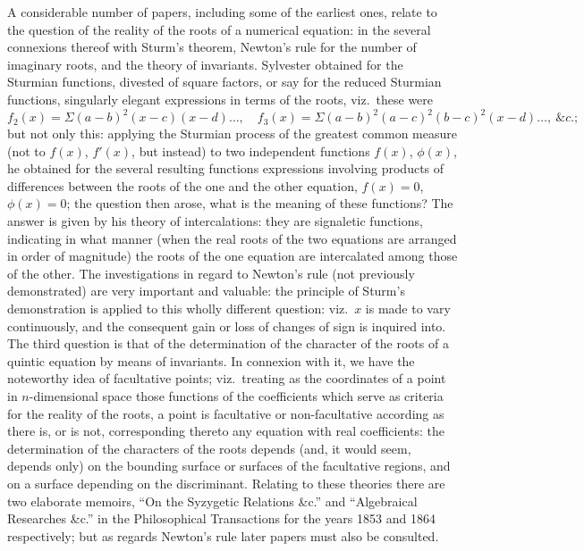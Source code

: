 \documentclass[11pt,a4paper]{book}
\begin{document}
A considerable number of papers, including some of the earliest ones, relate to the question of the reality of the roots of a numerical equation: in the several connexions thereof with Sturm's theorem, Newton's rule for the number of imaginary roots, and the theory of invariants. Sylvester obtained for the Sturmian functions, divested of square factors, or say for the reduced Sturmian functions, singularly elegant expressions in terms of the roots, viz.\ these were
\[
f_2(x) = \Sigma(a-b)^2(x-c)(x-d)\ldots,\quad f_3(x) = \Sigma(a-b)^2(a-c)^2(b-c)^2(x-d)\ldots,\ \&c.;
\]
but not only this: applying the Sturmian process of the greatest common measure (not to $f(x)$, $f'(x)$, but instead) to two independent functions $f(x)$, $\phi(x)$, he obtained for the several resulting functions expressions involving products of differences between the roots of the one and the other equation, $f(x) = 0$, $\phi(x) = 0$; the question then arose, what is the meaning of these functions? The answer is given by his theory of intercalations: they are signaletic functions, indicating in what manner (when the real roots of the two equations are arranged in order of magnitude) the roots of the one equation are intercalated among those of the other. The investigations in regard to Newton's rule (not previously demonstrated) are very important and valuable: the principle of Sturm's demonstration is applied to this wholly different question: viz.\ $x$ is made to vary continuously, and the consequent gain or loss of changes of sign is inquired into. The third question is that of the determination of the character of the roots of a quintic equation by means of invariants. In connexion with it, we have the noteworthy idea of facultative points; viz.\ treating as the coordinates of a point in $n$-dimensional space those functions of the coefficients which serve as criteria for the reality of the roots, a point is facultative or non-facultative according as there is, or is not, corresponding thereto any equation with real coefficients: the determination of the characters of the roots depends (and, it would seem, depends only) on the bounding surface or surfaces of the facultative regions, and on a surface depending on the discriminant. Relating to these theories there are two elaborate memoirs, ``On the Syzygetic Relations \&c.'' and ``Algebraical Researches \&c.'' in the Philosophical Transactions for the years 1853 and 1864 respectively; but as regards Newton's rule later papers must also be consulted.
\end{document}
